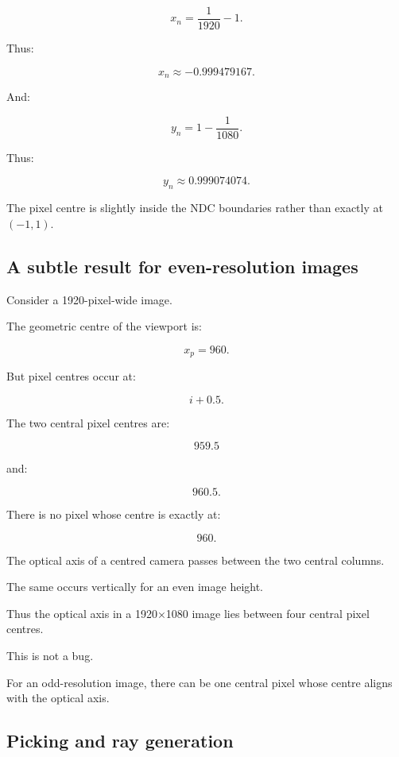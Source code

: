 \[
 x_n=\frac1{1920}-1.
\]

Thus:

\[
 \boxed{x_n\approx-0.999479167}.
\]

And:

\[
 y_n=1-\frac1{1080}.
\]

Thus:

\[
 \boxed{y_n\approx0.999074074}.
\]

The pixel centre is slightly inside the NDC boundaries rather than exactly at \((-1,1)\).

\subsection{A subtle result for even-resolution images}\label{02-foundations-ii-ch033-a-subtle-result-for-even-resolution-images}

\hypertarget{02-foundations-ii-ch033-a-subtle-result-for-even-resolution-images}{}

Consider a 1920-pixel-wide image.

The geometric centre of the viewport is:

\[
 x_p=960.
\]

But pixel centres occur at:

\[
 i+0.5.
\]

The two central pixel centres are:

\[
 959.5
\]

and:

\[
 960.5.
\]

There is no pixel whose centre is exactly at:

\[
 960.
\]

The optical axis of a centred camera passes between the two central columns.

The same occurs vertically for an even image height.

Thus the optical axis in a 1920×1080 image lies between four central pixel centres.

This is not a bug.

For an odd-resolution image, there can be one central pixel whose centre aligns with the optical axis.

\subsection{Picking and ray generation}\label{02-foundations-ii-ch033-picking-and-ray-generation}

\hypertarget{02-foundations-ii-ch033-picking-and-ray-generation}{}

